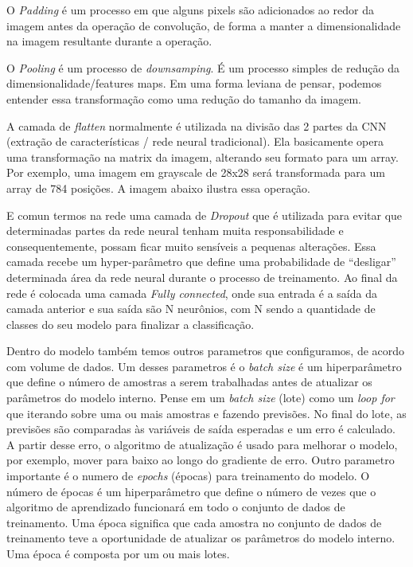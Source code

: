 \documentclass[openright]{UFRGS} %
\begin{document}
O \textit{Padding} é um processo em que alguns pixels são adicionados ao redor da imagem antes da operação de convolução, de forma a manter a dimensionalidade na imagem resultante durante a operação.


O \textit{Pooling} é um processo de \textit{downsamping}. É um processo simples de redução da dimensionalidade/features maps. Em uma forma leviana de pensar, podemos entender essa transformação como uma redução do tamanho da imagem.


A camada de  \textit{flatten} normalmente é utilizada na divisão das 2 partes da CNN (extração de características / rede neural tradicional). Ela basicamente opera uma transformação na matrix da imagem, alterando seu formato para um array. Por exemplo, uma imagem em grayscale de 28x28 será transformada para um array de 784 posições. A imagem abaixo ilustra essa operação.

E comun termos na rede uma camada de \textit{Dropout} que é utilizada para evitar que determinadas partes da rede neural tenham muita responsabilidade e consequentemente, possam ficar muito sensíveis a pequenas alterações. Essa camada recebe um hyper-parâmetro que define uma probabilidade de “desligar” determinada área da rede neural durante o processo de treinamento. Ao final da rede é colocada uma camada \textit{Fully connected}, onde sua entrada é a saída da camada anterior e sua saída são N neurônios, com N sendo a quantidade de classes do seu modelo para finalizar a classificação.

Dentro do modelo também temos outros parametros que configuramos, de acordo com volume de dados. Um desses parametros é o \textit{batch size} é um hiperparâmetro que define o número de amostras a serem trabalhadas antes de atualizar os parâmetros do modelo interno. Pense em um \textit{batch size} (lote) como um \textit{loop for} que iterando sobre uma ou mais amostras e fazendo previsões. No final do lote, as previsões são comparadas às variáveis de saída esperadas e um erro é calculado. A partir desse erro, o algoritmo de atualização é usado para melhorar o modelo, por exemplo, mover para baixo ao longo do gradiente de erro. Outro parametro importante  é o numero de \textit{epochs} (épocas) para treinamento do modelo. O número de épocas é um hiperparâmetro que define o número de vezes que o algoritmo de aprendizado funcionará em todo o conjunto de dados de treinamento. Uma época significa que cada amostra no conjunto de dados de treinamento teve a oportunidade de atualizar os parâmetros do modelo interno. Uma época é composta por um ou mais lotes.
\end{document}
